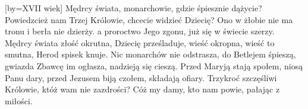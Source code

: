 [by={XVII wiek}]
\beginverse
Mędrcy świata, monarchowie,
gdzie śpiesznie dążycie?
Powiedzcież nam Trzej Królowie,
chcecie widzieć Dziecię?
Ono w żłobie nie ma tronu
i berła nie dzierży.
a proroctwo Jego zgonu,
już się w świecie szerzy.
\endverse
\beginverse
Mędrcy świata złość okrutna,
Dziecię prześladuje,
wieść okropna, wieść to smutna,
Herod spisek knuje.
Nic monarchów nie odstrasza,
do Betlejem śpieszą,
gwiazda Zbawcę im ogłasza,
nadzieją się cieszą.
\endverse
\beginverse
Przed Maryją stają społem,
niosą Panu dary,
przed Jezusem biją czołem,
składają ofiary.
Trzykroć szczęśliwi Królowie,
któż wam nie zazdrości?
Cóż my damy, kto nam powie,
pałając z miłości.
\endverse
\endsong